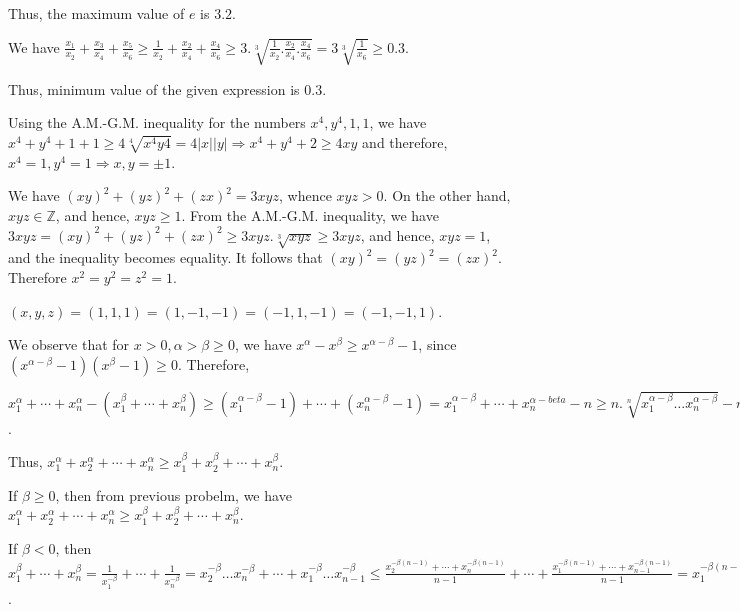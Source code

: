   Thus, the maximum value of $e$ is $3.2$.
\item We have $\frac{x_1}{x_2} + \frac{x_3}{x_4} + \frac{x_5}{x_6}\geq \frac{1}{x_2} + \frac{x_2}{x_4} +
  \frac{x_4}{x_6}\geq 3.\sqrt[3]{\frac{1}{x_2}.\frac{x_2}{x_4}.\frac{x_4}{x_6}} = 3\sqrt[3]{\frac{1}{x_6}}
  \geq 0.3$.

  Thus, minimum value of the given expression is $0.3$.
\item Using the A.M.-G.M. inequality for the numbers $x^4, y^4, 1, 1$, we have $x^4 + y^4 + 1 + 1\geq
  4\sqrt[4]{x^4y4} = 4|x||y|\Rightarrow x^4 + y^4 + 2\geq 4xy$ and therefore, $x^4 = 1, y^4 = 1\Rightarrow
  x, y = \pm 1$.
\item We have $(xy)^2 + (yz)^2 + (zx)^2 = 3xyz$, whence $xyz > 0$. On the other hand, $xyz\in\mathbb{Z}$,
  and hence, $xyz \geq 1$. From the A.M.-G.M. inequality, we have $3xyz = (xy)^2 + (yz)^2 + (zx)^2\geq
  3xyz.\sqrt[3]{xyz}\geq 3xyz$, and hence, $xyz = 1$, and the inequality becomes equality. It follows that
  $(xy)^2 = (yz)^2 = (zx)^2$. Therefore $x^2 = y^2 = z^2 = 1$.

  $(x, y, z) = (1, 1, 1) = (1, -1, -1) = (-1, 1, -1) = (-1, -1, 1)$.
\item We observe that for $x > 0, \alpha > \beta \geq 0$, we have $x^{\alpha} - x^{\beta}\geq x^{\alpha -
  \beta} - 1$, since $(x^{\alpha - \beta} - 1)(x^{\beta} - 1)\geq 0$. Therefore,

  $x_1^\alpha + \cdots + x_n^\alpha - (x_1^\beta + \cdots + x_n^\beta) \geq (x_1^{\alpha - \beta} - 1) +
  \cdots + (x_n^{\alpha - \beta} - 1) = x_1^{\alpha - \beta} + \cdots + x_n^{\alpha - beta} - n\geq
  n.\sqrt[n]{x_1^{\alpha - \beta}\ldots x_n^{\alpha - \beta}} - n = 0$.

  Thus, $x_1^\alpha + x_2^\alpha + \cdots + x_n^\alpha\geq x_1^\beta + x_2^\beta + \cdots + x_n^\beta$.
\item If $\beta\geq 0$, then from previous probelm, we have $x_1^\alpha + x_2^\alpha + \cdots +
  x_n^\alpha\geq x_1^\beta + x_2^\beta + \cdots + x_n^\beta$.

  If $\beta < 0$, then $x_1^\beta + \cdots + x_n^\beta = \frac{1}{x_1^{-\beta}} + \cdots +
  \frac{1}{x_n^{-\beta}} = x_2^{-\beta} \ldots x_n^{-\beta} + \cdots + x_1^{-\beta}\ldots x_{n -
    1}^{-\beta}\leq \frac{x_2^{-\beta(n - 1)} + \cdots + x_n^{-\beta(n - 1)}}{n - 1} + \cdots +
  \frac{x_1^{-\beta(n - 1)} + \cdots + x_{n - 1}^{-\beta(n - 1)}}{n - 1} = x_1^{-\beta(n - 1)} + \cdots +
  x_n^{-\beta(n - 1)}\leq x_1^{\alpha} + \cdots + x_n^{\alpha}$.

